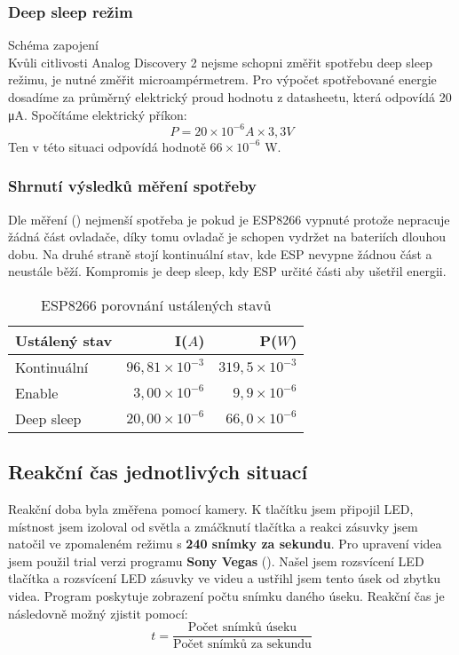 \documentclass[a4paper, 12pt]{report}
\begin{document}
				\subsubsection{Deep sleep režim}
					Schéma zapojení \\
					Kvůli citlivosti Analog Discovery 2 nejsme schopni změřit spotřebu deep sleep režimu, je nutné změřit microampérmetrem. Pro výpočet spotřebované energie dosadíme za průměrný elektrický proud hodnotu z datasheetu, která odpovídá 20 \si{\micro A}. Spočítáme elektrický příkon:
						$$P = 20\times 10^{-6} \si{A}\times 3,3 \si{V}$$
					Ten v této situaci odpovídá hodnotě $66 \times 10^{-6}$ \si{\watt}.

				\subsubsection{Shrnutí výsledků měření spotřeby}
					Dle měření () nejmenší spotřeba je pokud je ESP8266 vypnuté protože nepracuje žádná část ovladače, díky tomu ovladač je schopen vydržet na bateriích dlouhou dobu. Na druhé straně stojí kontinuální stav, kde ESP nevypne žádnou část a neustále běží. Kompromis je deep sleep, kdy ESP určité části aby ušetřil energii.

					\begin{table}[h]
						\centering
						\caption{ESP8266 porovnání ustálených stavů}
						\begin{tabular}{||l|r r||}
							\hline
							Ustálený stav & I($A$) & P($W$)\\
							\hline
							Kontinuální & $96,81 \times 10^{-3}$ & $319,5 \times 10^{-3}$\\
							Enable & $3,00\times 10^{-6}$ & $9,9 \times 10^{-6}$\\
							Deep sleep & $20,00\times 10^{-6}$ & $66,0 \times 10^{-6}$\\
							\hline
						\end{tabular}
						\label{ESP8266 klidové režimy}
					\end{table}

			\subsection{Reakční čas jednotlivých situací}
				Reakční doba byla změřena pomocí kamery. K tlačítku jsem připojil LED, místnost jsem izoloval od světla a zmáčknutí tlačítka a reakci zásuvky jsem natočil ve zpomaleném režimu s {\bf 240 snímky za sekundu}. Pro upravení videa jsem použil trial verzi programu {\bf Sony Vegas} (). Našel jsem rozsvícení LED tlačítka a rozsvícení LED zásuvky ve videu a ustřihl jsem tento úsek od zbytku videa. Program poskytuje zobrazení počtu snímku daného úseku. Reakční čas je následovně možný zjistit pomocí:
				$$ t = \frac{\textrm{Počet snímků úseku}}{\textrm{Počet snímků za sekundu}}$$
\end{document}
